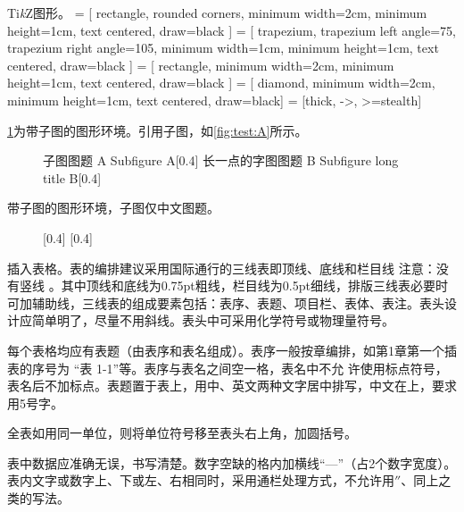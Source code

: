 Ti\textit{k}Z图形。
\usetikzlibrary{shapes.geometric, arrows}
 = [
rectangle,
rounded corners,
minimum width=2cm,
minimum height=1cm,
text centered,
draw=black
]
 = [
trapezium,
trapezium left angle=75,
trapezium right angle=105,
minimum width=1cm,
minimum height=1cm,
text centered,
draw=black
]
 = [
rectangle,
minimum width=2cm,
minimum height=1cm,
text centered,
draw=black
]
 = [
diamond,
minimum width=2cm,
minimum height=1cm,
text centered,
draw=black]
 = [thick, ->, >=stealth]

\begin{figure}[htbp]
	\centering
\end{figure}

\cref{fig:test}为带子图的图形环境。引用子图，如\cref{fig:test:A}所示。
\begin{figure}[htbp]
    \centering
    \bisubcaptionbox
    {子图图题 A\label{fig:test:A}}
    {Subfigure A}[0.4\textwidth]{}%
    \qquad
    \bisubcaptionbox
    {长一点的字图图题 B\label{fig:test:B}}
    {Subfigure long title B}[0.4\textwidth]{}%
    \label{fig:test}
\end{figure}

带子图的图形环境，子图仅中文图题。
\begin{figure}[htbp]
    \centering
    [0.4\textwidth]{}%
    \qquad
    [0.4\textwidth]{}%
\end{figure}

插入表格。表的编排建议采用国际通行的三线表即顶线、底线和栏目线 注意：没有竖线 。其中顶线和底线为0.75pt粗线，栏目线为0.5pt细线，排版三线表必要时可加辅助线，三线表的组成要素包括：表序、表题、项目栏、表体、表注。表头设计应简单明了，尽量不用斜线。表头中可采用化学符号或物理量符号。

每个表格均应有表题（由表序和表名组成）。表序一般按章编排，如第1章第一个插表的序号为 “表 1-1”等。表序与表名之间空一格，表名中不允 许使用标点符号，表名后不加标点。表题置于表上，用中、英文两种文字居中排写，中文在上，要求用5号字。

全表如用同一单位，则将单位符号移至表头右上角，加圆括号。

表中数据应准确无误，书写清楚。数字空缺的格内加横线“—”（占2个数字宽度）。表内文字或数字上、下或左、右相同时，采用通栏处理方式，不允许用$ '' $、同上之类的写法。

